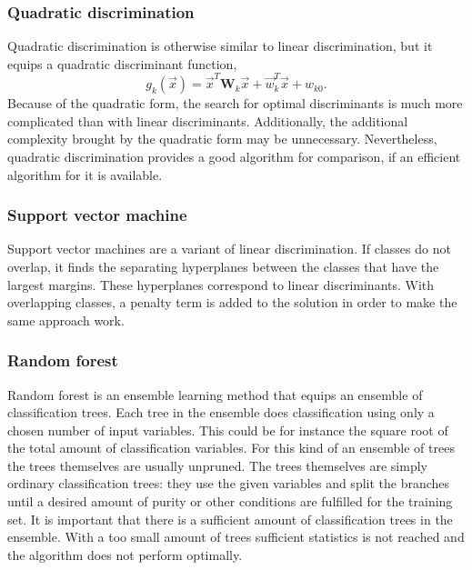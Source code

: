 \documentclass[twoside]{article}
\renewcommand{\v}[1]{\vec{#1}}
\begin{document}
\begin{multicols}{2}
\subsubsection{Quadratic discrimination}\label{method:qdiskr}

Quadratic discrimination is otherwise similar to linear discrimination, but it equips a quadratic discriminant function,
\begin{equation}
 g_k(\v{x}) = \v{x}^T \mathbf{W}_k \v{x} + \v{w}_k^T \v{x} + w_{k0}.
\end{equation}
Because of the quadratic form, the search for optimal discriminants is much more complicated than with linear
discriminants. Additionally, the additional complexity brought by the quadratic form may be unnecessary.
Nevertheless, quadratic discrimination provides a good algorithm for comparison, if an efficient algorithm
for it is available.

\subsubsection{Support vector machine}\label{method:svm}

Support vector machines are a variant of linear discrimination. If classes do not overlap, it finds
the separating hyperplanes between the classes that have the largest margins. These hyperplanes correspond 
to linear discriminants. With overlapping classes, a penalty term is added to the solution in order
to make the same approach work.

\subsubsection{Random forest}\label{method:randfor}

Random forest \cite{Forest} is an ensemble learning method that equips an ensemble of classification trees. Each tree 
in the ensemble does classification using only a chosen number of input variables. This could be for
instance the square root of the total amount of classification variables. For this kind of an ensemble of trees
the trees themselves are usually unpruned. The trees themselves are simply ordinary classification trees:
they use the given variables and split the branches until a desired amount of purity or other conditions
are fulfilled for the training set. It is important that there is a sufficient amount of classification
trees in the ensemble. With a too small amount of trees sufficient statistics is not reached and the algorithm
does not perform optimally.


\end{multicols}
\end{document}
